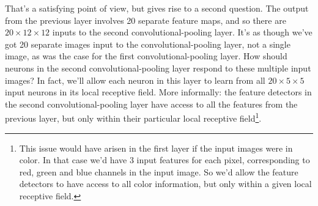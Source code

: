 \documentclass[a4paper,twoside,10pt]{book}
\begin{document}
That's a satisfying point of view, but gives rise to a second question. The output from the previous layer involves 20 separate feature maps, and so there are $20\times12\times12$ inputs to the second convolutional-pooling layer. It's as though we've got 20 separate images input to the convolutional-pooling layer, not a single image, as was the case for the first convolutional-pooling layer. How should neurons in the second convolutional-pooling layer respond to these multiple input images? In fact, we'll allow each neuron in this layer to learn from all $20\times5\times5$ input neurons in its local receptive field. More informally: the feature detectors in the second convolutional-pooling layer have access to all the features from the previous layer, but only within their particular local receptive field\footnote{This issue would have arisen in the first layer if the input images were in color. In that case we'd have 3 input features for each pixel, corresponding to red, green and blue channels in the input image. So we'd allow the feature detectors to have access to all color information, but only within a given local receptive field.}.
\end{document}
